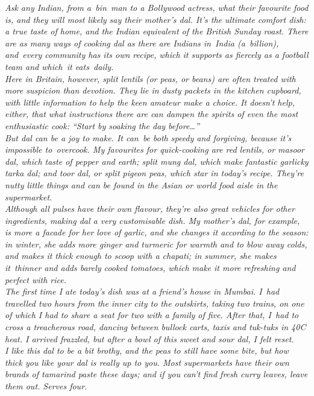 \documentclass{book}
\begin{document}
\emph{Ask any Indian, from a bin man to a Bollywood actress, what their favourite food is, and they will most likely say their mother’s dal. It’s the ultimate comfort dish: a true taste of home, and the Indian equivalent of the British Sunday roast. There are as many ways of cooking dal as there are Indians in India (a billion), and every community has its own recipe, which it supports as fiercely as a football team and which it eats daily.\\ 
Here in Britain, however, split lentils (or peas, or beans) are often treated with more suspicion than devotion. They lie in dusty packets in the kitchen cupboard, with little information to help the keen amateur make a choice. It doesn’t help, either, that what instructions there are can dampen the spirits of even the most enthusiastic cook: “Start by soaking the day before…”\\ 
But dal can be a joy to make. It can be both speedy and forgiving, because it’s impossible to overcook. My favourites for quick-cooking are red lentils, or masoor dal, which taste of pepper and earth; split mung dal, which make fantastic garlicky tarka dal; and toor dal, or split pigeon peas, which star in today’s recipe. They’re nutty little things and can be found in the Asian or world food aisle in the supermarket.\\ 
Although all pulses have their own flavour, they’re also great vehicles for other ingredients, making dal a very customisable dish. My mother’s dal, for example, is more a facade for her love of garlic, and she changes it according to the season: in winter, she adds more ginger and turmeric for warmth and to blow away colds, and makes it thick enough to scoop with a chapati; in summer, she makes it thinner and adds barely cooked tomatoes, which make it more refreshing and perfect with rice.\\ 
The first time I ate today’s dish was at a friend’s house in Mumbai. I had travelled two hours from the inner city to the outskirts, taking two trains, on one of which I had to share a seat for two with a family of five. After that, I had to cross a treacherous road, dancing between bullock carts, taxis and tuk-tuks in 40C heat. I arrived frazzled, but after a bowl of this sweet and sour dal, I felt reset.\\ 
I like this dal to be a bit brothy, and the peas to still have some bite, but how thick you like your dal is really up to you. Most supermarkets have their own brands of tamarind paste these days; and if you can’t find fresh curry leaves, leave them out. Serves four.}\\\\ 
\end{document}
